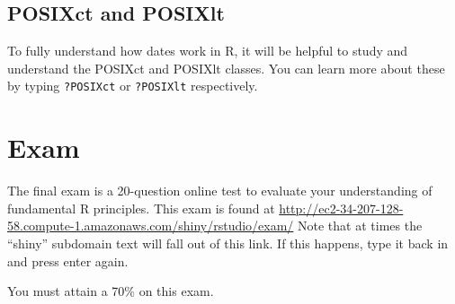 \documentclass[]{book}
\begin{document}
\section{POSIXct and POSIXlt}\label{posixct-and-posixlt}

To fully understand how dates work in R, it will be helpful to study and
understand the POSIXct and POSIXlt classes. You can learn more about
these by typing \texttt{?POSIXct} or \texttt{?POSIXlt} respectively.

\chapter{Exam}\label{exam}

The final exam is a 20-question online test to evaluate your
understanding of fundamental R principles. This exam is found at
\url{http://ec2-34-207-128-58.compute-1.amazonaws.com/shiny/rstudio/exam/}
Note that at times the ``shiny'' subdomain text will fall out of this
link. If this happens, type it back in and press enter again.

You must attain a 70\% on this exam.


\end{document}
